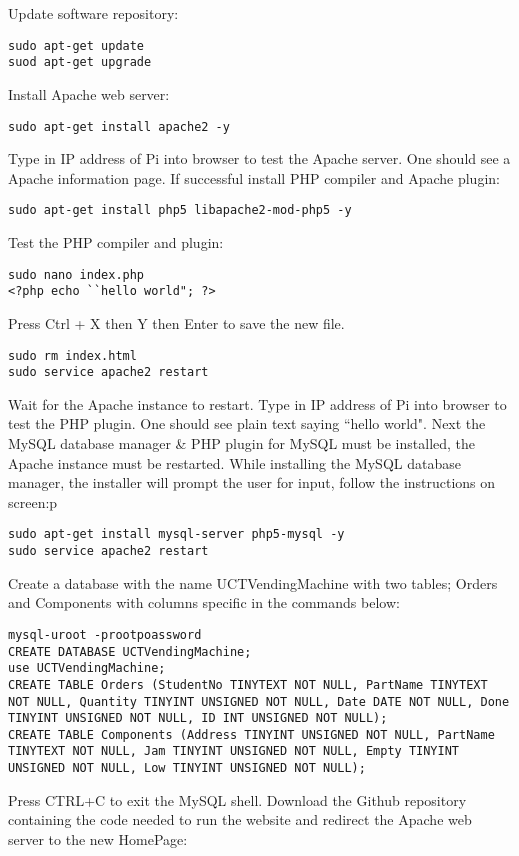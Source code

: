 \documentclass[a4paper,11pt]{article}
\numberwithin{figure}{section}
\numberwithin{table}{section}
\begin{document}
\begin{appendices}
Update software repository:
\begin{lstlisting}
sudo apt-get update
suod apt-get upgrade
\end{lstlisting}
Install Apache web server:
\begin{lstlisting}[firstnumber=3]
sudo apt-get install apache2 -y
\end{lstlisting}
Type in IP address of Pi into browser to test the Apache server. One should see a Apache information page. If successful install PHP compiler and Apache plugin:
\begin{lstlisting}[firstnumber=4]
sudo apt-get install php5 libapache2-mod-php5 -y
\end{lstlisting}
Test the PHP compiler and plugin:
\begin{lstlisting}[firstnumber=5]
sudo nano index.php
<?php echo ``hello world"; ?>
\end{lstlisting}
Press Ctrl + X then Y then Enter to save the new file.
\begin{lstlisting}[firstnumber=7]
sudo rm index.html
sudo service apache2 restart
\end{lstlisting}
Wait for the Apache instance to restart. Type in IP address of Pi into browser to test the PHP plugin. One should see plain text saying ``hello world". Next the MySQL database manager \& PHP plugin for MySQL must be installed, the Apache instance must be restarted. While installing the MySQL database manager, the installer will prompt the user for input, follow the instructions on screen:p
\begin{lstlisting}[firstnumber=9]
sudo apt-get install mysql-server php5-mysql -y
sudo service apache2 restart
\end{lstlisting}
Create a database with the name UCTVendingMachine with two tables; Orders and Components with columns specific in the commands below:
\begin{lstlisting}[firstnumber=11]
mysql-uroot -prootpoassword
CREATE DATABASE UCTVendingMachine;
use UCTVendingMachine;
CREATE TABLE Orders (StudentNo TINYTEXT NOT NULL, PartName TINYTEXT NOT NULL, Quantity TINYINT UNSIGNED NOT NULL, Date DATE NOT NULL, Done TINYINT UNSIGNED NOT NULL, ID INT UNSIGNED NOT NULL);
CREATE TABLE Components (Address TINYINT UNSIGNED NOT NULL, PartName TINYTEXT NOT NULL, Jam TINYINT UNSIGNED NOT NULL, Empty TINYINT UNSIGNED NOT NULL, Low TINYINT UNSIGNED NOT NULL);
\end{lstlisting}
Press CTRL+C to exit the MySQL shell. Download the Github repository containing the code needed to run the website and redirect the Apache web server to the new HomePage:

\end{appendices}
\end{document}
